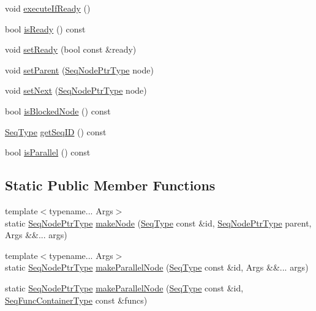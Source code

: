 \begin{DoxyCompactItemize}
void \hyperlink{structvt_1_1seq_1_1_seq_node_a1e13cfd0886c5b377cf6b02d584096e5}{execute\+If\+Ready} ()
\item 
bool \hyperlink{structvt_1_1seq_1_1_seq_node_a94e0c20ef534afed7180b16d8af9a268}{is\+Ready} () const
\item 
void \hyperlink{structvt_1_1seq_1_1_seq_node_af12dafb9242411bc072f3889aa7afaae}{set\+Ready} (bool const \&ready)
\item 
void \hyperlink{structvt_1_1seq_1_1_seq_node_ae475f4a6a842766eb22bdd3204b35719}{set\+Parent} (\hyperlink{namespacevt_1_1seq_ae6a4874b585be0612aaca32ca6d2d191}{Seq\+Node\+Ptr\+Type} node)
\item 
void \hyperlink{structvt_1_1seq_1_1_seq_node_afd77c05a6301d91d1ac3dab9c84d2561}{set\+Next} (\hyperlink{namespacevt_1_1seq_ae6a4874b585be0612aaca32ca6d2d191}{Seq\+Node\+Ptr\+Type} node)
\item 
bool \hyperlink{structvt_1_1seq_1_1_seq_node_a18b16cf28c574103927ee3ba86ed25a4}{is\+Blocked\+Node} () const
\item 
\hyperlink{namespacevt_1_1seq_a3b612da217ac669d39c159f134ab8434}{Seq\+Type} \hyperlink{structvt_1_1seq_1_1_seq_node_a1bd6d41892c8291b6222465c72c33eba}{get\+Seq\+ID} () const
\item 
bool \hyperlink{structvt_1_1seq_1_1_seq_node_ac1b29546daefe9e5983e42a1acf5b961}{is\+Parallel} () const
\end{DoxyCompactItemize}
\subsection*{Static Public Member Functions}
\begin{DoxyCompactItemize}
\item 
{\footnotesize template$<$typename... Args$>$ }\\static \hyperlink{namespacevt_1_1seq_ae6a4874b585be0612aaca32ca6d2d191}{Seq\+Node\+Ptr\+Type} \hyperlink{structvt_1_1seq_1_1_seq_node_a5db1688ed515cf55ae71c58259560bc3}{make\+Node} (\hyperlink{namespacevt_1_1seq_a3b612da217ac669d39c159f134ab8434}{Seq\+Type} const \&id, \hyperlink{namespacevt_1_1seq_ae6a4874b585be0612aaca32ca6d2d191}{Seq\+Node\+Ptr\+Type} parent, Args \&\&... args)
\item 
{\footnotesize template$<$typename... Args$>$ }\\static \hyperlink{namespacevt_1_1seq_ae6a4874b585be0612aaca32ca6d2d191}{Seq\+Node\+Ptr\+Type} \hyperlink{structvt_1_1seq_1_1_seq_node_aa7b64d1e28e2516f7041d0f682ea6d5a}{make\+Parallel\+Node} (\hyperlink{namespacevt_1_1seq_a3b612da217ac669d39c159f134ab8434}{Seq\+Type} const \&id, Args \&\&... args)
\item 
static \hyperlink{namespacevt_1_1seq_ae6a4874b585be0612aaca32ca6d2d191}{Seq\+Node\+Ptr\+Type} \hyperlink{structvt_1_1seq_1_1_seq_node_a6f750e19fb10c44756874ec41c1de31b}{make\+Parallel\+Node} (\hyperlink{namespacevt_1_1seq_a3b612da217ac669d39c159f134ab8434}{Seq\+Type} const \&id, \hyperlink{namespacevt_1_1seq_a3d4575155fb9c0aeeb30b089adfdd04d}{Seq\+Func\+Container\+Type} const \&funcs)
\end{DoxyCompactItemize}


